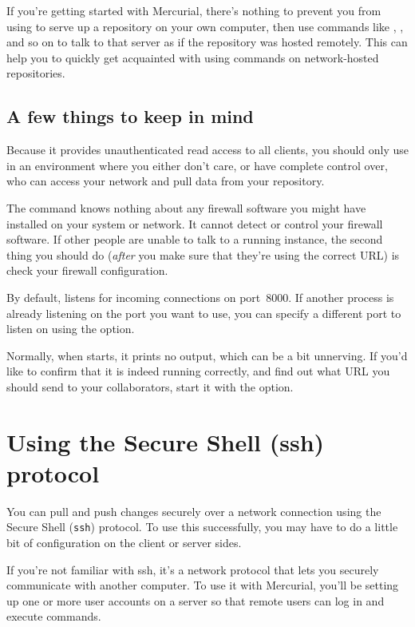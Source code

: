 If you're getting started with Mercurial, there's nothing to prevent
you from using  to serve up a repository on your own
computer, then use commands like , , and
so on to talk to that server as if the repository was hosted remotely.
This can help you to quickly get acquainted with using commands on
network-hosted repositories.

\subsection{A few things to keep in mind}

Because it provides unauthenticated read access to all clients, you
should only use  in an environment where you either don't
care, or have complete control over, who can access your network and
pull data from your repository.

The  command knows nothing about any firewall software
you might have installed on your system or network.  It cannot detect
or control your firewall software.  If other people are unable to talk
to a running  instance, the second thing you should do
(\emph{after} you make sure that they're using the correct URL) is
check your firewall configuration.

By default,  listens for incoming connections on
port~8000.  If another process is already listening on the port you
want to use, you can specify a different port to listen on using the
 option.

Normally, when  starts, it prints no output, which can be
a bit unnerving.  If you'd like to confirm that it is indeed running
correctly, and find out what URL you should send to your
collaborators, start it with the  option.

\section{Using the Secure Shell (ssh) protocol}
\label{sec:collab:ssh}

You can pull and push changes securely over a network connection using
the Secure Shell (\texttt{ssh}) protocol.  To use this successfully,
you may have to do a little bit of configuration on the client or
server sides.

If you're not familiar with ssh, it's a network protocol that lets you
securely communicate with another computer.  To use it with Mercurial,
you'll be setting up one or more user accounts on a server so that
remote users can log in and execute commands.

